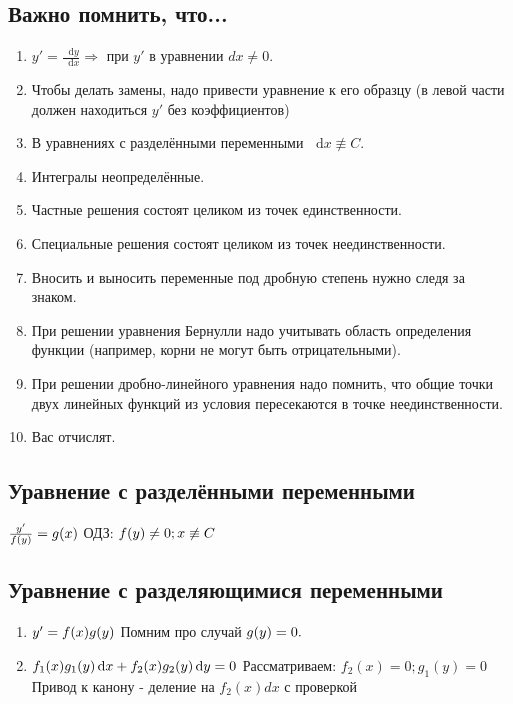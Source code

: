 \documentclass[12pt]{article}
\newcommand*\diff{\mathop{}\!\mathrm{d}}
\begin{document}
\subsection{Важно помнить, что...}
\begin{enumerate}
\item $y' = \frac{\diff y}{\diff x} \Rightarrow $ при $y'$ в уравнении $dx \neq 0$.
\item Чтобы делать замены, надо привести уравнение к его образцу (в левой части должен находиться $y'$ без коэффициентов) 
\item В уравнениях с разделёнными переменными $\diff x \not\equiv C$.
\item Интегралы неопределённые.
\item Частные решения состоят целиком из точек единственности.
\item Специальные решения состоят целиком из точек неединственности.
\item Вносить и выносить переменные под дробную степень нужно следя за знаком.
\item При решении уравнения Бернулли надо учитывать область определения функции (например, корни не могут быть отрицательными).
\item При решении дробно-линейного уравнения надо помнить, что общие точки двух линейных функций из условия пересекаются в точке неединственности.
\item Вас отчислят.
\end{enumerate}

\subsection{Уравнение с разделёнными переменными}
$\frac{y'}{f(y)} = g(x) \\$
ОДЗ: $f(y) \neq 0; x \not\equiv C\\$
\subsection{Уравнение с разделяющимися переменными}

\begin{enumerate}
\item $y' = f(x)g(y) \\ $
Помним про случай $g(y) = 0 .\\$ 
\item $f_1(x)g_1(y) \diff x + f_2(x) g_2(y) \diff y = 0 \\$
Рассматриваем: $f_2(x) = 0;g_1(y) = 0$
Привод к канону - деление на $f_2(x)dx$ с проверкой
\end{enumerate}
\end{document}
